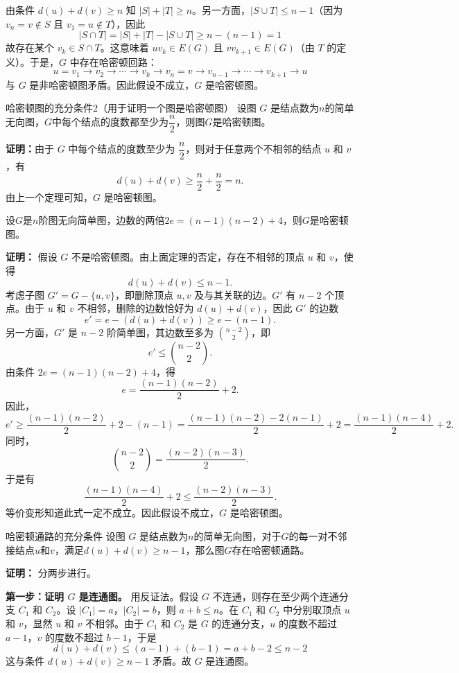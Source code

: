 由条件 $d(u) + d(v) \ge n$ 知 $|S| + |T| \ge n$。另一方面，$|S \cup T| \le n-1$（因为 $v_n = v \notin S$ 且 $v_1 = u \notin T$），因此
\[
|S \cap T| = |S| + |T| - |S \cup T| \ge n - (n-1) = 1
\]
故存在某个 $v_k \in S \cap T$。这意味着 $uv_k \in E(G)$ 且 $v v_{k+1} \in E(G)$（由 $T$ 的定义）。于是，$G$ 中存在哈密顿回路：
\[
u = v_1 \to v_2 \to \cdots \to v_{k} \to v_n = v \to v_{n-1} \to \cdots \to v_{k+1} \to u
\]
与 $G$ 是非哈密顿图矛盾。因此假设不成立，$G$ 是哈密顿图。
\begin{theorem}{哈密顿图的充分条件2（用于证明一个图是哈密顿图）}{}
设图 $G$ 是结点数为$n$的简单无向图，$G$中每个结点的度数都至少为$\dfrac{n}2$，则图$G$是哈密顿图。
\end{theorem}
\textbf{证明：}由于 $G$ 中每个结点的度数至少为 $\dfrac{n}{2}$，则对于任意两个不相邻的结点 $u$ 和 $v$，有
    \[
    d(u) + d(v) \geqslant \frac{n}{2} + \frac{n}{2} = n.
    \]
由上一个定理可知，$G$ 是哈密顿图。
\begin{example}{}{}
    设$G$是$n$阶图无向简单图，边数的两倍$2e=(n-1)(n-2)+4$，则$G$是哈密顿图。
\end{example}
\textbf{证明：} 假设 $G$ 不是哈密顿图。由上面定理的否定，存在不相邻的顶点 $u$ 和 $v$，使得
    \[
    d(u) + d(v) \le n-1.
    \]
    考虑子图 $G' = G - \{u, v\}$，即删除顶点 $u, v$ 及与其关联的边。$G'$ 有 $n-2$ 个顶点。由于 $u$ 和 $v$ 不相邻，删除的边数恰好为 $d(u) + d(v)$，因此 $G'$ 的边数
    \[
    e' = e - (d(u) + d(v)) \ge e - (n-1).
    \]
    另一方面，$G'$ 是 $n-2$ 阶简单图，其边数至多为 $\binom{n-2}{2}$，即
    \[
    e' \le \binom{n-2}{2}.
    \]
    由条件 $2e = (n-1)(n-2) + 4$，得
    \[
    e = \frac{(n-1)(n-2)}{2} + 2.
    \]
    因此，
    \[
    e' \ge \frac{(n-1)(n-2)}{2} + 2 - (n-1) = \frac{(n-1)(n-2) - 2(n-1)}{2} + 2 = \frac{(n-1)(n-4)}{2} + 2.
    \]
    同时，
    \[
    \binom{n-2}{2} = \frac{(n-2)(n-3)}{2}.
    \]
    于是有
    \[
    \frac{(n-1)(n-4)}{2} + 2 \le \frac{(n-2)(n-3)}{2}.
    \]
    等价变形知道此式一定不成立。因此假设不成立，$G$ 是哈密顿图。
\begin{theorem}{哈密顿通路的充分条件}{}
    设图 $G$ 是结点数为$n$的简单无向图，对于$G$的每一对不邻接结点$u$和$v$，满足$d(u)+d(v)\geqslant n-1$，那么图$G$存在哈密顿通路。
\end{theorem}
\textbf{证明：}
    分两步进行。

    \textbf{第一步：证明 $G$ 是连通图。}
    用反证法。假设 $G$ 不连通，则存在至少两个连通分支 $C_1$ 和 $C_2$。设 $|C_1| = a$，$|C_2| = b$，则 $a + b \le n$。在 $C_1$ 和 $C_2$ 中分别取顶点 $u$ 和 $v$，显然 $u$ 和 $v$ 不相邻。由于 $C_1$ 和 $C_2$ 是 $G$ 的连通分支，$u$ 的度数不超过 $a-1$，$v$ 的度数不超过 $b-1$，于是
    \[
    d(u) + d(v) \le (a-1) + (b-1) = a + b - 2 \le n-2
    \]
    这与条件 $d(u) + d(v) \ge n-1$ 矛盾。故 $G$ 是连通图。

